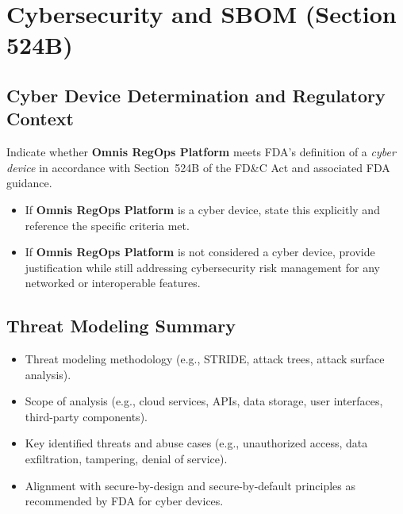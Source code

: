 \documentclass[11pt]{article}
\begin{document}
\newpage

\section{Cybersecurity and SBOM (Section 524B)}

\subsection{Cyber Device Determination and Regulatory Context}
Indicate whether \textbf{Omnis RegOps Platform} meets FDA's definition of a
\textit{cyber device} in accordance with Section~524B of the FD\&C Act and
associated FDA guidance.

\begin{itemize}
    \item If \textbf{Omnis RegOps Platform} is a cyber device, state this explicitly
          and reference the specific criteria met.
    \item If \textbf{Omnis RegOps Platform} is not considered a cyber device, provide
          justification while still addressing cybersecurity risk management for
          any networked or interoperable features.
\end{itemize}

\subsection{Threat Modeling Summary}
\begin{itemize}
    \item Threat modeling methodology (e.g., STRIDE, attack trees, attack
          surface analysis).
    \item Scope of analysis (e.g., cloud services, APIs, data storage, user
          interfaces, third-party components).
    \item Key identified threats and abuse cases (e.g., unauthorized access,
          data exfiltration, tampering, denial of service).
    \item Alignment with secure-by-design and secure-by-default principles as
          recommended by FDA for cyber devices.
\end{itemize}
\end{document}
